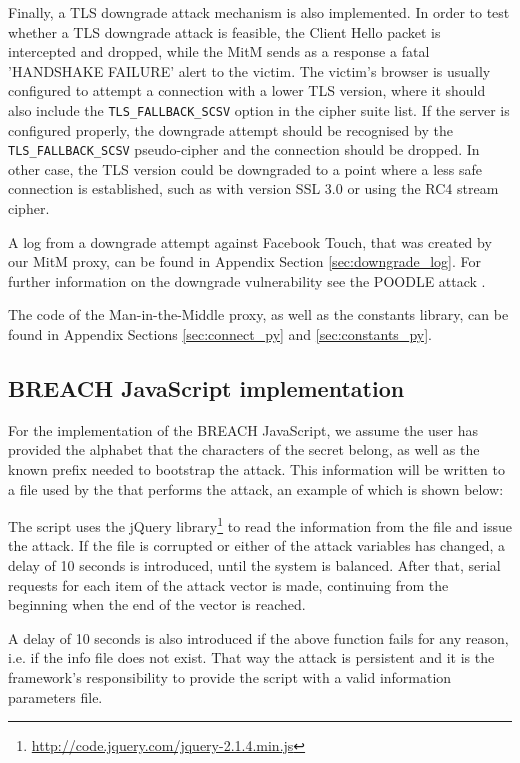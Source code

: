 Finally, a TLS downgrade attack mechanism is also implemented. In order to test
whether a TLS downgrade attack is feasible, the Client Hello packet is
intercepted and dropped, while the MitM sends as a response a fatal 'HANDSHAKE
FAILURE' alert to the victim. The victim's browser is usually configured to
attempt a connection with a lower TLS version, where it should also include the
\texttt{TLS\_FALLBACK\_SCSV} option in the cipher suite list. If the server is
configured properly, the downgrade attempt should be recognised by the
\texttt{TLS\_FALLBACK\_SCSV} pseudo-cipher and the connection should be dropped.
In other case, the TLS version could be downgraded to a point where a less safe
connection is established, such as with version SSL 3.0 or using the RC4 stream
cipher.

A log from a downgrade attempt against Facebook Touch, that was created by our
MitM proxy, can be found in Appendix Section \ref{sec:downgrade_log}. For
further information on the downgrade vulnerability see the POODLE attack
\cite{poodle}.

The code of the Man-in-the-Middle proxy, as well as the constants library, can
be found in Appendix Sections \ref{sec:connect_py} and \ref{sec:constants_py}.

\subsection{BREACH JavaScript implementation}

For the implementation of the BREACH JavaScript, we assume the user has provided
the alphabet that the characters of the secret belong, as well as the known
prefix needed to bootstrap the attack. This information will be written to a
file used by the that performs the attack, an example of which is shown below:


The script uses the jQuery
library\footnote{\url{http://code.jquery.com/jquery-2.1.4.min.js}} to read the
information from the file and issue the attack. If the file is corrupted or
either of the attack variables has changed, a delay of 10 seconds is introduced,
until the system is balanced. After that, serial requests for each item of the
attack vector is made, continuing from the beginning when the end of the vector
is reached.

A delay of 10 seconds is also introduced if the above function fails for any
reason, i.e. if the info file does not exist. That way the attack is persistent
and it is the framework's responsibility to provide the script with a valid
information parameters file.

